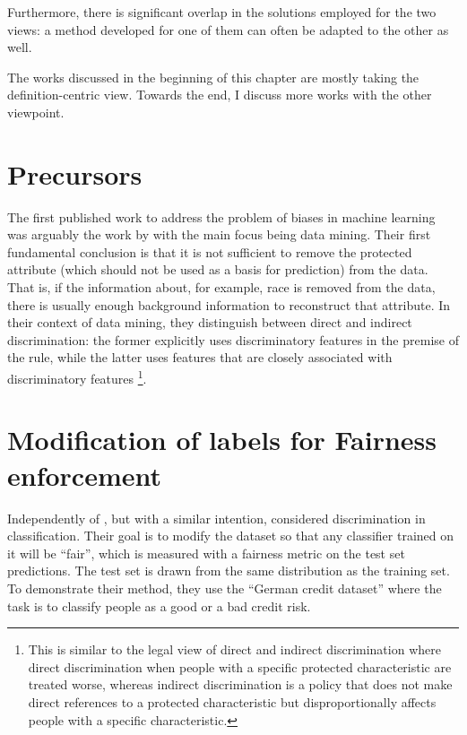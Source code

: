 Furthermore, there is significant overlap in the solutions employed for the two views:
a method developed for one of them can often be adapted to the other as well.

The works discussed in the beginning of this chapter are mostly taking the definition-centric view.
Towards the end, I discuss more works with the other viewpoint.

\section{Precursors}\label{precursor}
The first published work to address the problem of biases in machine learning
was arguably the work by \citet{pedreshi2008discrimination}
with the main focus being data mining.
Their first fundamental conclusion
is that it is not sufficient to remove the protected attribute
(which should not be used as a basis for prediction) from the data.
That is, if the information about, for example, race
is removed from the data,
there is usually enough background information to reconstruct that attribute.
In their context of data mining,
they distinguish between direct and indirect discrimination:
the former explicitly uses discriminatory features in the premise of the rule,
while the latter uses features that are closely associated with discriminatory features%
\footnote{This is similar to the legal view of direct and indirect discrimination
where direct discrimination when people with a specific protected characteristic are treated worse,
whereas indirect discrimination is a policy that does not make direct references to a protected characteristic
but disproportionally affects people with a specific characteristic.}.

\section{Modification of labels for Fairness enforcement}\label{modification-of-labels-for-fairness-enforcement}
Independently of \citet{pedreshi2008discrimination}, but with a similar intention,
\citet{kamiran2009classifying} considered discrimination in classification.
Their goal is to modify the dataset so that any classifier trained on it will be ``fair'',
which is measured with a fairness metric on the test set predictions.
The test set is drawn from the same distribution as the training set.
To demonstrate their method, they use the ``German credit dataset''
where the task is to classify people as a good or a bad credit risk.

